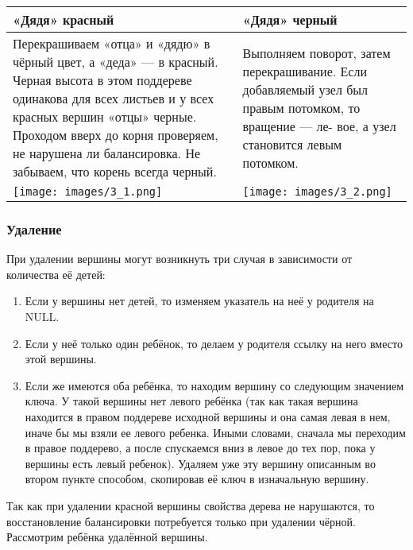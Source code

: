 \begin{center}
\begin{tabular}{|m{8cm}|m{8cm}|}
\hline
«Дядя» красный & «Дядя» черный \\ \hline
Перекрашиваем «отца» и «дядю» в чёрный цвет, а «деда» --- в красный.
Черная высота в этом поддереве одинакова для всех листьев и у всех красных вершин «отцы» черные.
Проходом вверх до корня проверяем, не нарушена ли балансировка.
Не забываем, что корень всегда черный. &
Выполняем поворот, затем перекрашивание.
Если добавляемый узел был правым потомком, то вращение --- ле-
вое, а узел становится левым потомком. \\ \hline

\texttt{[image: images/3\_1.png]} 
&
\texttt{[image: images/3\_2.png]} \\ \hline

\end{tabular}
\end{center}

\subsubsection{Удаление}

При удалении вершины могут возникнуть три случая в зависимости от количества её детей:
\begin{enumerate}
    \item Если у вершины нет детей, то изменяем указатель на неё у родителя на NULL.
    \item Если у неё только один ребёнок, то делаем у родителя ссылку на него вместо этой вершины.
    \item Если же имеются оба ребёнка, то находим вершину со следующим значением ключа.
    У такой вершины нет левого ребёнка (так как такая вершина находится в правом поддереве исходной вершины и она самая левая в нем, иначе бы мы взяли ее левого ребенка.
    Иными словами, сначала мы переходим в правое поддерево, а после спускаемся вниз в левое до тех пор, пока у вершины есть левый ребенок).
    Удаляем уже эту вершину описанным во втором пункте способом, скопировав её ключ в изначальную вершину.
\end{enumerate}

Так как при удалении красной вершины свойства дерева не нарушаются, то восстановление балансировки потребуется только при удалении чёрной.
Рассмотрим ребёнка удалённой вершины.


